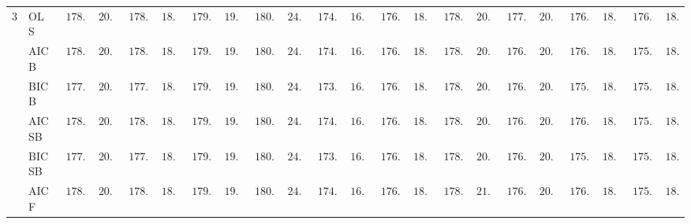 \begin{tabular}{p{0.2cm}p{1cm}|p{0.6cm}p{0.6cm}|p{0.6cm}p{0.6cm}p{0.6cm}p{0.6cm}p{0.6cm}p{0.6cm}|p{0.6cm}p{0.6cm}p{0.6cm}p{0.6cm}p{0.6cm}p{0.6cm}|p{0.6cm}p{0.6cm}p{0.6cm}p{0.6cm}p{0.6cm}p{0.6cm}}
3 & OLS  & $\phantom{0}178.48$ & $\phantom{0}20.29$ & $\phantom{0}178.54$ & $\phantom{0}18.40$ & $\phantom{0}179.81$ & $\phantom{0}19.81$ & $\phantom{0}180.63$ & $\phantom{0}24.23$ & $\phantom{0}174.55$ & $\phantom{0}16.46$ & $\phantom{0}176.55$ & $\phantom{0}18.29$ & $\phantom{0}178.48$ & $\phantom{0}20.84$ & $\phantom{0}177.10$ & $\phantom{0}20.22$ & $\phantom{0}176.41$ & $\phantom{0}18.58$ & $\phantom{0}176.12$ & $\phantom{0}18.98$ \\
 & AIC B  & $\phantom{0}178.14$ & $\phantom{0}20.33$ & $\phantom{0}178.14$ & $\phantom{0}18.34$ & $\phantom{0}179.48$ & $\phantom{0}19.77$ & $\phantom{0}180.31$ & $\phantom{0}24.29$ & $\phantom{0}174.31$ & $\phantom{0}16.46$ & $\phantom{0}176.08$ & $\phantom{0}18.07$ & $\phantom{0}178.28$ & $\phantom{0}20.95$ & $\phantom{0}176.90$ & $\phantom{0}20.13$ & $\phantom{0}176.23$ & $\phantom{0}18.52$ & $\phantom{0}175.96$ & $\phantom{0}18.86$ \\
 & BIC B  & $\phantom{0}177.68$ & $\phantom{0}20.18$ & $\phantom{0}177.96$ & $\phantom{0}18.41$ & $\phantom{0}179.31$ & $\phantom{0}19.64$ & $\phantom{0}180.33$ & $\phantom{0}24.15$ & $\phantom{0}173.97$ & $\phantom{0}16.23$ & $\phantom{0}176.04$ & $\phantom{0}18.19$ & $\phantom{0}178.07$ & $\phantom{0}20.92$ & $\phantom{0}176.63$ & $\phantom{0}20.08$ & $\phantom{0}175.79$ & $\phantom{0}18.66$ & $\phantom{0}175.82$ & $\phantom{0}18.83$ \\
 & AIC SB  & $\phantom{0}178.14$ & $\phantom{0}20.33$ & $\phantom{0}178.14$ & $\phantom{0}18.34$ & $\phantom{0}179.48$ & $\phantom{0}19.77$ & $\phantom{0}180.31$ & $\phantom{0}24.29$ & $\phantom{0}174.31$ & $\phantom{0}16.46$ & $\phantom{0}176.08$ & $\phantom{0}18.07$ & $\phantom{0}178.28$ & $\phantom{0}20.95$ & $\phantom{0}176.90$ & $\phantom{0}20.13$ & $\phantom{0}176.23$ & $\phantom{0}18.52$ & $\phantom{0}175.96$ & $\phantom{0}18.86$ \\
 & BIC SB  & $\phantom{0}177.68$ & $\phantom{0}20.18$ & $\phantom{0}177.96$ & $\phantom{0}18.41$ & $\phantom{0}179.31$ & $\phantom{0}19.64$ & $\phantom{0}180.33$ & $\phantom{0}24.15$ & $\phantom{0}173.97$ & $\phantom{0}16.23$ & $\phantom{0}176.07$ & $\phantom{0}18.18$ & $\phantom{0}178.07$ & $\phantom{0}20.92$ & $\phantom{0}176.63$ & $\phantom{0}20.08$ & $\phantom{0}175.79$ & $\phantom{0}18.66$ & $\phantom{0}175.82$ & $\phantom{0}18.83$ \\
 & AIC F  & $\phantom{0}178.14$ & $\phantom{0}20.33$ & $\phantom{0}178.14$ & $\phantom{0}18.34$ & $\phantom{0}179.45$ & $\phantom{0}19.77$ & $\phantom{0}180.28$ & $\phantom{0}24.28$ & $\phantom{0}174.29$ & $\phantom{0}16.46$ & $\phantom{0}176.02$ & $\phantom{0}18.09$ & $\phantom{0}178.19$ & $\phantom{0}21.00$ & $\phantom{0}176.90$ & $\phantom{0}20.13$ & $\phantom{0}176.21$ & $\phantom{0}18.51$ & $\phantom{0}175.89$ & $\phantom{0}18.87$ \\

\end{tabular}
